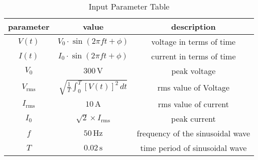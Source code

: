 \begin{table}
\centering
  \begin{tabular}{|c|c|c|}
    \hline
    parameter & value & description \\
    \hline
    $V(t)$ & $V_{\text{0}} \cdot \sin(2\pi ft + \phi)$ & voltage in terms of time \\
    \hline
    $I(t)$ & $I_{\text{0}} \cdot \sin(2\pi ft + \phi)$ & current in terms of time \\
    \hline
    $V_0$ & $300 \, \text{V}$ & peak voltage \\
    \hline
    $V_\text{rms}$ & $\sqrt{\frac{1}{T} \int_{0}^{T} [V(t)]^2 \, dt}$ & rms value of Voltage \\
    \hline 
    $I_\text{rms}$ & $10 \, \text{A}$ & rms value of current\\
    \hline
    $I_0$ & $\sqrt{2} \times I_{\text{rms}}$ & peak current \\
    \hline
    $f$ & $50 \, \text{Hz}$ & frequency of the sinusoidal wave \\
    \hline
    $T$ & $0.02 \, \text{s}$ & time period of sinusoidal wave \\
    \hline
  \end{tabular}

\caption{Input Parameter Table}
\label{tab:input_parameters}
\end{table}
